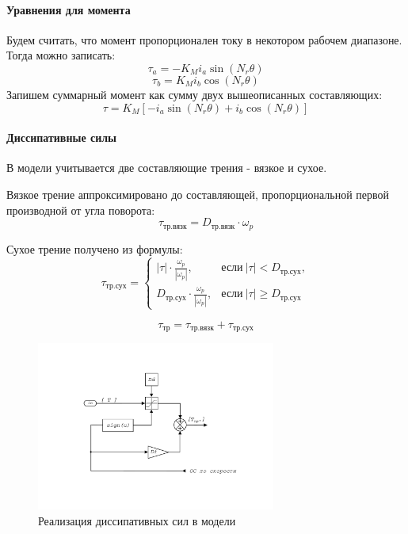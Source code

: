 \paragraph{Уравнения для момента}
Будем считать, что момент пропорционален току в некотором рабочем диапазоне. Тогда можно записать:
$$
    \tau_{a} = - K_{M} i_{a} \sin({N_{r} \theta})
$$
$$
    \tau_{b} = K_{M} i_{b} \cos({N_{r} \theta})
$$
Запишем суммарный момент как сумму двух вышеописанных составляющих:
\begin{equation}
    \tau = K_{M} [-i_{a} \sin({N_{r}\theta}) + i_{b} \cos({N_{r}\theta})]
\end{equation}

\paragraph{Диссипативные силы}
В модели учитывается две составляющие трения - вязкое и сухое.

Вязкое трение аппроксимировано до составляющей, пропорциональной первой производной от угла поворота:
\begin{equation}
    \tau_{\text{тр.вязк}} = D_{\text{тр.вязк}} \cdot \omega_{p}
\end{equation}

Сухое трение получено из формулы:
\begin{equation}
    \tau_{\text{тр.сух}} = \begin{cases}
         |\tau| \cdot \frac{\omega_{p}}{|\omega_{p}|}, & \text{если} ~|\tau|  <  D_{\text{тр.сух}}, \\[2mm]
         D_{\text{тр.сух}}  \cdot \frac{\omega_{p}}{|\omega_{p}|}, & \text{если} ~|\tau| \ge D_{\text{тр.сух}}
    \end{cases}
\end{equation}

\begin{equation}
    \tau_{\text{тр}} = \tau_{\text{тр.вязк}} + \tau_{\text{тр.сух}}
\end{equation}

\begin{figure}[ht!]
    \centering
    \includegraphics[width=0.7\textwidth, keepaspectratio, clip=true, trim=25mm 35mm 25mm 35mm]
                    {./src/pictures/drive_model/drive_model_friction}
    \caption{Реализация диссипативных сил в модели}
    \label{pic_drive_model_friction}
\end{figure}

